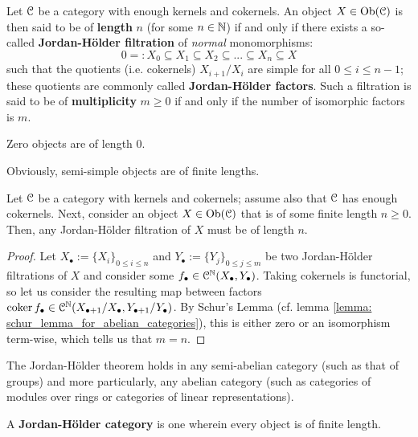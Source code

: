             \begin{definition} \label{def: lengths_of_objects_and_jordan_holder_series}
                Let $\mathcal{C}$ be a category with enough kernels and cokernels. An object $X \in \mathrm{Ob}(\mathcal{C})$ is then said to be of \textbf{length} $n$ (for some $n \in \mathbb{N}$) if and only if there exists a so-called \textbf{Jordan-H\"older filtration} of \textit{normal} monomorphisms:
                    $$0 =: X_0 \subseteq X_1 \subseteq X_2 \subseteq ... \subseteq X_n \subseteq X$$
                such that the quotients (i.e. cokernels) $X_{i + 1}/X_i$ are simple for all $0 \leq i \leq n - 1$; these quotients are commonly called \textbf{Jordan-H\"older factors}. Such a filtration is said to be of \textbf{multiplicity} $m \geq 0$ if and only if the number of isomorphic factors is $m$. 
            \end{definition}
            \begin{convention}
                Zero objects are of length $0$.
            \end{convention}
            \begin{remark}
                Obviously, semi-simple objects are of finite lengths. 
            \end{remark}
            \begin{theorem} \label{theorem: jordan_holder_theorem}
                Let $\mathcal{C}$ be a category with kernels and cokernels; assume also that $\mathcal{C}$ has enough cokernels. Next, consider an object $X \in \mathrm{Ob}(\mathcal{C})$ that is of some finite length $n \geq 0$. Then, any Jordan-H\"older filtration of $X$ must be of length $n$.
            \end{theorem}
                \begin{proof}
                    Let $X_{\bullet} := \{X_i\}_{0 \leq i \leq n}$ and $Y_{\bullet} := \{Y_j\}_{0 \leq j \leq m}$ be two Jordan-H\"older filtrations of $X$ and consider some $f_{\bullet} \in \mathcal{C}^{\mathbb{N}}(X_{\bullet}, Y_{\bullet})$. Taking cokernels is functorial, so let us consider the resulting map between factors $\operatorname{coker} f_{\bullet} \in \mathcal{C}^{\mathbb{N}}(X_{\bullet + 1}/X_{\bullet}, Y_{\bullet + 1}/Y_{\bullet})$. By Schur's Lemma (cf. lemma \ref{lemma: schur_lemma_for_abelian_categories}), this is either zero or an isomorphism term-wise, which tells us that $m = n$. 
                \end{proof}
            \begin{example}
                The Jordan-H\"older theorem holds in any semi-abelian category (such as that of groups) and more particularly, any abelian category (such as categories of modules over rings or categories of linear representations).
            \end{example}
            \begin{definition} \label{def: jordan_holder_categories}
                A \textbf{Jordan-H\"older category} is one wherein every object is of finite length.
            \end{definition}
        
